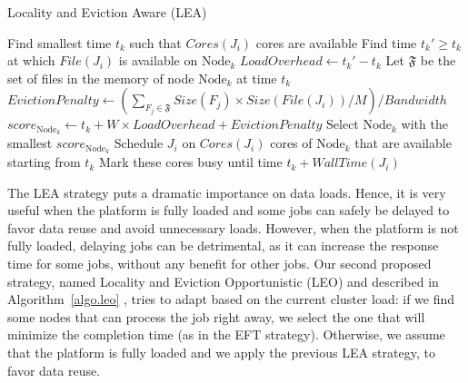 \documentclass[conference]{IEEEtran}
\newcommand{\Node}[1]{\ensuremath{\mathrm{Node}_{#1}}\xspace}
\newcommand{\file}{\ensuremath{\mathit{File}}\xspace}
\newcommand{\size}{\ensuremath{\mathit{Size}}\xspace}
\newcommand{\memory}{\ensuremath{\mathit{M}}\xspace}
\newcommand{\bandwidth}{\mathit{Bandwidth}\xspace}
\newcommand{\core}{\mathit{Cores}\xspace}
\newcommand{\walltime}{\mathit{WallTime}\xspace}
\newcommand{\filesubset}{\ensuremath{\mathfrak{F}}\xspace}
\newcommand{\nodeset}{\ensuremath{\mathbb{N}}\xspace}
\begin{document}
\begin{algorithm}[t]
\caption{Locality and Eviction Aware (LEA)}\label{algo.lea}
\begin{algorithmic}[1]
		\ForEach{$\Node{k} \in \nodeset$}
			\State Find smallest time $t_k$ such that $\core(J_i)$ cores are available
			\State Find time $t_k'\geq t_k$ at which $\file(J_i)$ is available on $\Node{k}$
			\State $\mathit{LoadOverhead} \gets t_k' - t_k$ %
                        \State Let $\filesubset$ be the set of files in the memory of node \Node{k} at time $t_k$
			\State $\mathit{EvictionPenalty} \gets
			(\sum_{F_j\in\filesubset}\size(F_j) \times \size(\file(J_i))/\memory)/\bandwidth$
			\State $score_{\Node{k}} \gets t_k + W \times \mathit{LoadOverhead} + \mathit{EvictionPenalty}$
		\EndFor
                \State Select \Node{k} with the smallest $score_{\Node{k}}$
                \State Schedule $J_i$ on $\core(J_i)$ cores of \Node{k} that are available starting from $t_k$
                \State Mark these cores busy until time $t_k +\walltime(J_i)$
	\EndFor
\end{algorithmic}
\end{algorithm}

The LEA strategy puts a dramatic importance on data loads. Hence, it
is very useful when the platform is fully loaded and some jobs
can safely be delayed to favor data reuse and avoid
unnecessary loads. However, when the platform is not fully loaded,
delaying jobs can be detrimental, as it can increase the response
time for some jobs, without any benefit for other jobs. Our second proposed strategy,
named Locality and Eviction Opportunistic (LEO) 
and described in Algorithm~\ref{algo.leo}
, tries to adapt based
on the current cluster load: if we find some nodes that can process the job
right away, we select the one that will minimize the completion time
(as in the EFT strategy). Otherwise, we assume that the platform is
fully loaded and we apply the previous LEA strategy, to favor data reuse.
\end{document}
